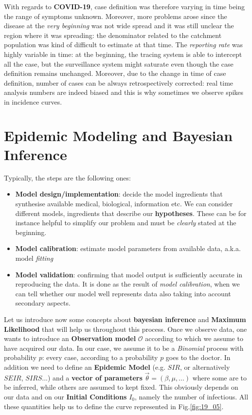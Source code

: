 \documentclass[../main/main.tex]{subfiles}
\begin{document}
With regards to \textbf{COVID-19}, case definition was therefore varying in time being the range of symptoms unknown. Moreover, more problems arose since the disease at the \textit{very beginning} was not wide spread and it was still unclear the region where it was spreading: the denominator related to the catchment population was kind of difficult to estimate at that time. The \textit{reporting rate} was highly variable in time: at the beginning, the tracing system is able to intercept all the case, but the surveillance system might saturate even though the case definition remains unchanged. Moreover, due to the change in time of case definition, number of cases can be always retrospectively corrected: real time analysis numbers are indeed biased and this is why sometimes we observe spikes in incidence curves.






\section{Epidemic Modeling and Bayesian Inference}

Typically, the steps are the following ones:
\begin{itemize}
    \item \textbf{Model design/implementation}: decide the model ingredients that synthesise available medical, biological, information etc. We can consider different models, ingredients that describe our \textbf{hypotheses}. These can be for instance helpful to simplify our problem and must be \textit{clearly} stated at the beginning.
    \item \textbf{Model calibration}: estimate model parameters from available data, a.k.a. model \textit{fitting}
    \item \textbf{Model validation}: confirming that model output is sufficiently accurate in reproducing the data. It is done as the result of \textit{model calibration}, when we can tell whether our model well represents data also taking into account secondary aspects.
\end{itemize}

Let us introduce now some concepts about \textbf{bayesian inference} and \textbf{Maximum Likelihood} that will help us throughout this process. Once we observe data, one wants to introduce an \textbf{Observation model} $\mathcal{O}$ according to which we assume to have acquired our data. In our case, we assume it to be a \textit{Binomial} process with probability $p$: every case, according to a probability $p$ goes to the doctor. In addition we need to define an \textbf{Epidemic Model} (e.g. $SIR$, or alternatively $SEIR$, $SIRS$...) and a \textbf{vector of parameters} $\vec{\theta} = ( \beta, \mu, ...)$ where some are to be inferred, while others are assumed to kept fixed. This obviously depends on our data and on our \textbf{Initial Conditions} $I_0$, namely the number of infectious. All these quantities help us to define the curve represented in Fig.\ref{fig:19_05}.
\end{document}
